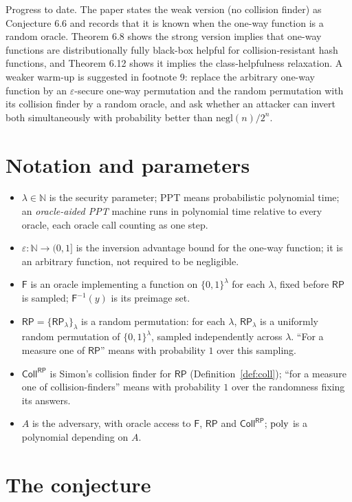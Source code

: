 \documentclass{aicr-conjecture}
\newcommand{\Fo}{\mathsf{F}}          %
\newcommand{\RP}{\mathsf{RP}}
\newcommand{\Coll}{\mathsf{Coll}}
\newcommand{\negl}{\mathrm{negl}}
\newcommand{\bits}{\{0,1\}}
\begin{document}
Progress to date. The paper states the weak version (no collision finder)
as Conjecture 6.6 and records that it is known when the one-way function is
a random oracle. Theorem 6.8 shows the strong version implies that one-way
functions are distributionally fully black-box helpful for
collision-resistant hash functions, and Theorem 6.12 shows it implies the
class-helpfulness relaxation. A weaker warm-up is suggested in footnote 9:
replace the arbitrary one-way function by an $\varepsilon$-secure one-way
permutation and the random permutation with its collision finder by a
random oracle, and ask whether an attacker can invert both simultaneously
with probability better than $\negl(n)/2^{n}$.

\section{Notation and parameters}\label{sec:notation}

\begin{itemize}
\item $\lambda\in\mathbb N$ is the security parameter; PPT means
  probabilistic polynomial time; an \emph{oracle-aided PPT} machine runs in
  polynomial time relative to every oracle, each oracle call counting as
  one step.
\item $\varepsilon:\mathbb N\to(0,1]$ is the inversion advantage bound for
  the one-way function; it is an arbitrary function, not required to be
  negligible.
\item $\Fo$ is an oracle implementing a function on $\bits^{\lambda}$ for
  each $\lambda$, fixed before $\RP$ is sampled; $\Fo^{-1}(y)$ is its
  preimage set.
\item $\RP=\{\RP_{\lambda}\}_{\lambda}$ is a random permutation: for each
  $\lambda$, $\RP_{\lambda}$ is a uniformly random permutation of
  $\bits^{\lambda}$, sampled independently across $\lambda$. ``For a
  measure one of $\RP$'' means with probability $1$ over this sampling.
\item $\Coll^{\RP}$ is Simon's collision finder for $\RP$
  (Definition~\ref{def:coll}); ``for a measure one of collision-finders''
  means with probability $1$ over the randomness fixing its answers.
\item $A$ is the adversary, with oracle access to $\Fo$, $\RP$ and
  $\Coll^{\RP}$; $\mathrm{poly}$ is a polynomial depending on $A$.
\end{itemize}

\section{The conjecture}\label{sec:conjectures}
\end{document}
